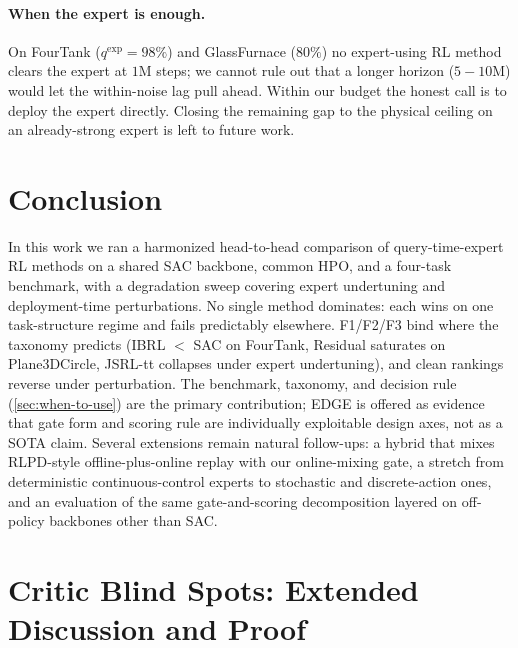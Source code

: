 \documentclass{article}
\begin{document}
\paragraph{When the expert is enough.}
On FourTank ($q^{\mathrm{exp}}\!=\!98\%$) and GlassFurnace
($80\%$) no expert-using RL method clears the expert at
$1\mathrm{M}$ steps; we cannot rule out that a longer horizon
($5{-}10\mathrm{M}$) would let the within-noise lag pull ahead.
Within our budget the honest call is to deploy the expert
directly. Closing the remaining gap to the physical ceiling on an
already-strong expert is left to future work.

\section{Conclusion}
\label{sec:conclusion}

In this work we ran a harmonized head-to-head comparison of
query-time-expert RL methods on a shared SAC backbone, common HPO,
and a four-task benchmark, with a degradation sweep covering
expert undertuning and deployment-time perturbations.
No single method dominates: each wins on one task-structure
regime and fails predictably elsewhere. F1/F2/F3
bind where the taxonomy predicts (IBRL $<$ SAC on FourTank,
Residual saturates on Plane3DCircle, JSRL-tt collapses under
expert undertuning), and clean rankings reverse under perturbation.
The benchmark, taxonomy, and decision rule
(\cref{sec:when-to-use}) are the primary contribution; EDGE is
offered as evidence that gate form and scoring rule are
individually exploitable design axes, not as a SOTA claim. Several extensions remain natural follow-ups: a hybrid that mixes
RLPD-style offline-plus-online replay with our online-mixing
gate, a stretch from deterministic continuous-control experts to
stochastic and discrete-action ones, and an evaluation of the same
gate-and-scoring decomposition layered on off-policy backbones
other than SAC.








\appendix

\section{Critic Blind Spots: Extended Discussion and Proof}
\label{app:proofs}
\end{document}

